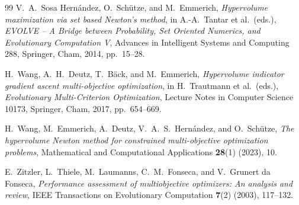 \documentclass{article}
\theoremstyle{definition}
\newcommand{\1}{\mathbf{1}}
\begin{document}
\begin{thebibliography}{99}
V.~A.~Sosa Hern\'andez, O.~Sch{\"u}tze, and M.~Emmerich,
\emph{Hypervolume maximization via set based Newton's method},
in A.-A.~Tantar et al.~(eds.), \emph{EVOLVE -- A Bridge between Probability, Set Oriented Numerics, and Evolutionary Computation V}, Advances in Intelligent Systems and Computing 288, Springer, Cham, 2014, pp.~15--28.

H.~Wang, A.~H.~Deutz, T.~B{\"a}ck, and M.~Emmerich,
\emph{Hypervolume indicator gradient ascent multi-objective optimization},
in H.~Trautmann et al.~(eds.), \emph{Evolutionary Multi-Criterion Optimization},
Lecture Notes in Computer Science 10173, Springer, Cham, 2017, pp.~654--669.

H.~Wang, M.~Emmerich, A.~Deutz, V.~A.~S.~Hern{\'a}ndez, and O.~Sch{\"u}tze,
\emph{The hypervolume Newton method for constrained multi-objective optimization problems},
Mathematical and Computational Applications \textbf{28}(1) (2023), 10.

E.~Zitzler, L.~Thiele, M.~Laumanns, C.~M.~Fonseca, and V.~Grunert da Fonseca,
\emph{Performance assessment of multiobjective optimizers: An analysis and review},
IEEE Transactions on Evolutionary Computation \textbf{7}(2) (2003), 117--132.
\end{thebibliography}
\end{document}
